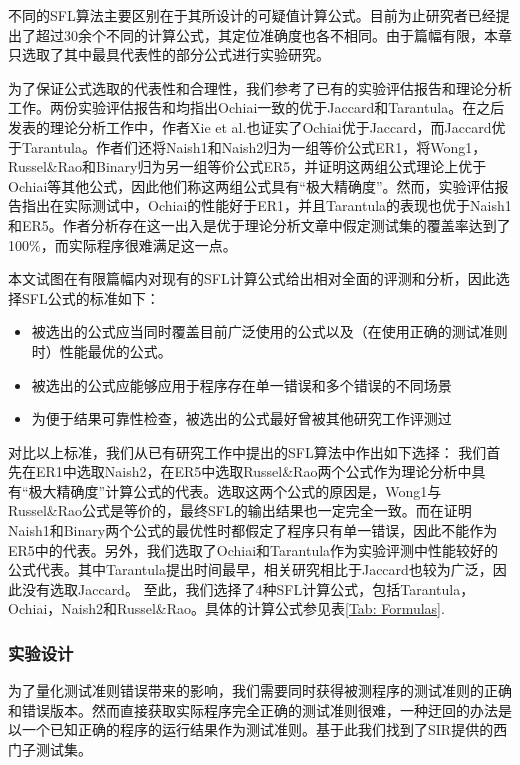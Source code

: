 不同的SFL算法主要区别在于其所设计的可疑值计算公式。目前为止研究者已经提出了超过30余个不同的计算公式，其定位准确度也各不相同。由于篇幅有限，本章只选取了其中最具代表性的部分公式进行实验研究。

为了保证公式选取的代表性和合理性，我们参考了已有的实验评估报告和理论分析工作。两份实验评估报告\cite{Yu:2008:ESE:1368088.1368116}和\cite{Abreu20091780}均指出Ochiai一致的优于Jaccard和Tarantula。在之后发表的理论分析工作\cite{xie2013theoretical}中，作者Xie et al.也证实了Ochiai优于Jaccard，而Jaccard优于Tarantula。作者们还将Naish1和Naish2归为一组等价公式ER1，将Wong1，Russel\&Rao和Binary归为另一组等价公式ER5，并证明这两组公式理论上优于Ochiai等其他公式，因此他们称这两组公式具有“极大精确度”。然而，实验评估报告\cite{6676912}指出在实际测试中，Ochiai的性能好于ER1，并且Tarantula的表现也优于Naish1和ER5。作者分析存在这一出入是优于理论分析文章\cite{xie2013theoretical}中假定测试集的覆盖率达到了100\%，而实际程序很难满足这一点。

本文试图在有限篇幅内对现有的SFL计算公式给出相对全面的评测和分析，因此选择SFL公式的标准如下：
\begin{itemize}
\item 被选出的公式应当同时覆盖目前广泛使用的公式以及（在使用正确的测试准则时）性能最优的公式。
\item 被选出的公式应能够应用于程序存在单一错误和多个错误的不同场景
\item 为便于结果可靠性检查，被选出的公式最好曾被其他研究工作评测过
\end{itemize}

对比以上标准，我们从已有研究工作中提出的SFL算法中作出如下选择：
我们首先在ER1中选取Naish2，在ER5中选取Russel\&Rao两个公式作为理论分析中具有“极大精确度”计算公式的代表。选取这两个公式的原因是，Wong1与Russel\&Rao公式是等价的，最终SFL的输出结果也一定完全一致。而在证明Naish1和Binary两个公式的最优性时都假定了程序只有单一错误，因此不能作为ER5中的代表。另外，我们选取了Ochiai和Tarantula作为实验评测中性能较好的公式代表。其中Tarantula提出时间最早，相关研究相比于Jaccard也较为广泛，因此没有选取Jaccard。
至此，我们选择了4种SFL计算公式，包括Tarantula，Ochiai，Naish2和Russel\&Rao。具体的计算公式参见表\ref{Tab: Formulas}.

\subsubsection{实验设计}\label{subsection data collection}

为了量化测试准则错误带来的影响，我们需要同时获得被测程序的测试准则的正确和错误版本。然而直接获取实际程序完全正确的测试准则很难，一种迂回的办法是以一个已知正确的程序的运行结果作为测试准则。基于此我们找到了SIR提供的西门子测试集。

